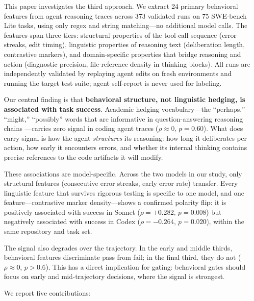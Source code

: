 \documentclass[11pt]{article}
\begin{document}
This paper investigates the third approach.
We extract 24 primary behavioral features from agent reasoning traces across 373 validated runs on 75 SWE-bench Lite tasks, using only regex and string matching---no additional model calls.
The features span three tiers: structural properties of the tool-call sequence (error streaks, edit timing), linguistic properties of reasoning text (deliberation length, contrastive markers), and domain-specific properties that bridge reasoning and action (diagnostic precision, file-reference density in thinking blocks).
All runs are independently validated by replaying agent edits on fresh environments and running the target test suite; agent self-report is never used for labeling.

Our central finding is that \textbf{behavioral structure, not linguistic hedging, is associated with task success}.
Academic hedging vocabulary---the ``perhaps,'' ``might,'' ``possibly'' words that are informative in question-answering reasoning chains \citep{vanhoyweghen2025lexical}---carries zero signal in coding agent traces ($\rho \approx 0$, $p = 0.60$).
What does carry signal is how the agent \emph{structures} its reasoning: how long it deliberates per action, how early it encounters errors, and whether its internal thinking contains precise references to the code artifacts it will modify.

These associations are model-specific.
Across the two models in our study, only structural features (consecutive error streaks, early error rate) transfer.
Every linguistic feature that survives rigorous testing is specific to one model, and one feature---contrastive marker density---shows a confirmed polarity flip: it is positively associated with success in Sonnet ($\rho = +0.282$, $p = 0.008$) but negatively associated with success in Codex ($\rho = -0.264$, $p = 0.020$), within the same repository and task set.

The signal also degrades over the trajectory.
In the early and middle thirds, behavioral features discriminate pass from fail; in the final third, they do not ($\rho \approx 0$, $p > 0.6$).
This has a direct implication for gating: behavioral gates should focus on early and mid-trajectory decisions, where the signal is strongest.

We report five contributions:
\end{document}
